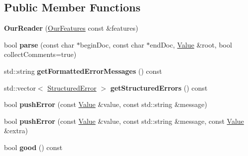 \subsection*{Public Member Functions}
\begin{DoxyCompactItemize}
\item 
\hypertarget{class_json_1_1_our_reader_a48a850914b9c8d7781be172930c478e5}{}{\bfseries Our\+Reader} (\hyperlink{class_json_1_1_our_features}{Our\+Features} const \&features)\label{class_json_1_1_our_reader_a48a850914b9c8d7781be172930c478e5}

\item 
\hypertarget{class_json_1_1_our_reader_aba4f8749aab7f02ec17f107e392caf80}{}bool {\bfseries parse} (const char $\ast$begin\+Doc, const char $\ast$end\+Doc, \hyperlink{class_json_1_1_value}{Value} \&root, bool collect\+Comments=true)\label{class_json_1_1_our_reader_aba4f8749aab7f02ec17f107e392caf80}

\item 
\hypertarget{class_json_1_1_our_reader_ae9cbb7dbd9c6c96be37432e8dfa1afcb}{}std\+::string {\bfseries get\+Formatted\+Error\+Messages} () const \label{class_json_1_1_our_reader_ae9cbb7dbd9c6c96be37432e8dfa1afcb}

\item 
\hypertarget{class_json_1_1_our_reader_a02ef7871af3706754a233c36e6d489e9}{}std\+::vector$<$ \hyperlink{struct_json_1_1_our_reader_1_1_structured_error}{Structured\+Error} $>$ {\bfseries get\+Structured\+Errors} () const \label{class_json_1_1_our_reader_a02ef7871af3706754a233c36e6d489e9}

\item 
\hypertarget{class_json_1_1_our_reader_aef7aa4ca22ffaa38c401b16951d20e1e}{}bool {\bfseries push\+Error} (const \hyperlink{class_json_1_1_value}{Value} \&value, const std\+::string \&message)\label{class_json_1_1_our_reader_aef7aa4ca22ffaa38c401b16951d20e1e}

\item 
\hypertarget{class_json_1_1_our_reader_ad43315cbb0d6804e3b7177e84a1ec53d}{}bool {\bfseries push\+Error} (const \hyperlink{class_json_1_1_value}{Value} \&value, const std\+::string \&message, const \hyperlink{class_json_1_1_value}{Value} \&extra)\label{class_json_1_1_our_reader_ad43315cbb0d6804e3b7177e84a1ec53d}

\item 
\hypertarget{class_json_1_1_our_reader_a048346238d703ad9aed06beb686e6102}{}bool {\bfseries good} () const \label{class_json_1_1_our_reader_a048346238d703ad9aed06beb686e6102}

\end{DoxyCompactItemize}
